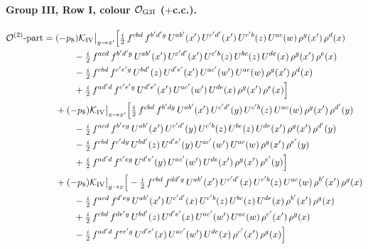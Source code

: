 \documentclass[10pt]{article}
\numberwithin{equation}{section}
\newcommand{\OO}{\mathcal O}
\newcommand{\KK}{\mathcal K}
\begin{document}
\paragraph{Group III, Row I, colour $\OO_{\rm G3I}$ ($+$c.c.).}
\begin{align}
\OO^{(2)}\text{-part}={}&(-p_8)\KK_{\rm IV}\big|_{y\to x'}\Big[\tfrac{i}{2}\,f^{cbd}\,f^{b'd'g}\,U^{ab'}(x')\,U^{c'd'}(x')\,U^{c'b}(z)\,U^{ac}(w)\,\rho^{g}(x')\,\rho^{d}(x)\notag\\
&\qquad-\tfrac{i}{2}\,f^{acd}\,f^{b'd'g}\,U^{ab'}(x')\,U^{c'd'}(x')\,U^{c'b}(z)\,U^{bc}(z)\,U^{de}(x)\,\rho^{g}(x')\,\rho^{e}(x)\notag\\
&\qquad-\tfrac{i}{2}\,f^{cbd}\,f^{c'e'g}\,U^{bd'}(z)\,U^{d'e'}(x')\,U^{ac'}(w')\,U^{ac}(w)\,\rho^{g}(x')\,\rho^{d}(x)\notag\\
&\qquad+\tfrac{i}{2}\,f^{ad'd}\,f^{c'e'g}\,U^{d'e'}(x')\,U^{ac'}(w')\,U^{de}(x)\,\rho^{g}(x')\,\rho^{e}(x)\Big]\notag\\
&+(-p_8)\KK_{\rm IV}\big|_{x\to x'}\Big[\tfrac{i}{2}\,f^{cbd}\,f^{b'dg}\,U^{ab'}(x')\,U^{c'd'}(y)\,U^{c'b}(z)\,U^{ac}(w)\,\rho^{g}(x')\,\rho^{d'}(y)\notag\\
&\qquad-\tfrac{i}{2}\,f^{acd}\,f^{b'eg}\,U^{ab'}(x')\,U^{c'd'}(y)\,U^{c'b}(z)\,U^{bc}(z)\,U^{de}(x')\,\rho^{g}(x')\,\rho^{d'}(y)\notag\\
&\qquad-\tfrac{i}{2}\,f^{cbd}\,f^{c'dg}\,U^{bd'}(z)\,U^{d'e'}(y)\,U^{ac'}(w')\,U^{ac}(w)\,\rho^{g}(x')\,\rho^{e'}(y)\notag\\
&\qquad+\tfrac{i}{2}\,f^{ad'd}\,f^{c'eg}\,U^{d'e'}(y)\,U^{ac'}(w')\,U^{de}(x')\,\rho^{g}(x')\,\rho^{e'}(y)\Big]\notag\\
&+(-p_8)\KK_{\rm IV}\big|_{y\to x}\Big[-\tfrac{i}{2}\,f^{cbd}\,f^{dd'g}\,U^{ab'}(x')\,U^{c'd'}(x)\,U^{c'b}(z)\,U^{ac}(w)\,\rho^{b'}(x')\,\rho^{g}(x)\notag\\
&\qquad-\tfrac{i}{2}\,f^{acd}\,f^{d'eg}\,U^{ab'}(x')\,U^{c'd'}(x)\,U^{c'b}(z)\,U^{bc}(z)\,U^{de}(x)\,\rho^{b'}(x')\,\rho^{g}(x)\notag\\
&\qquad+\tfrac{i}{2}\,f^{cbd}\,f^{de'g}\,U^{bd'}(z)\,U^{d'e'}(x)\,U^{ac'}(w')\,U^{ac}(w)\,\rho^{c'}(x')\,\rho^{g}(x)\notag\\
&\qquad-\tfrac{i}{2}\,f^{ad'd}\,f^{ee'g}\,U^{d'e'}(x)\,U^{ac'}(w')\,U^{de}(x)\,\rho^{c'}(x')\,\rho^{g}(x)\Big]
\end{align}
\end{document}
